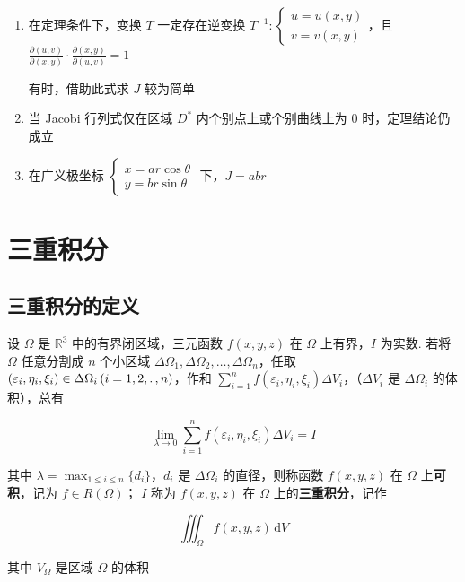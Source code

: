 \documentclass[lang = zh , final , oneside , openany , titlepage , zihao = -4 , linespread = 1.3 , baselineskip = false , cjk-font = windows , text-font = newtx , math-font = newtx , math-style = ISO , uppercase-greek = upright , integral-limits = false]{sjtureport}
\begin{document}
\begin{enumerate}
\item
  在定理条件下，变换 \(T\) 一定存在逆变换
  \(T^{-1}:\begin{cases}u=u(x,y)\\v=v(x,y)\end{cases}\)，且
  \(\frac{\partial (u,v)}{\partial (x,y)}\cdot \frac{\partial (x,y)}{\partial (u,v)} = 1\)

  有时，借助此式求 \(J\) 较为简单
\item
  当 Jacobi 行列式仅在区域 \(D^*\) 内个别点上或个别曲线上为 \(0\)
  时，定理结论仍成立
\item
  在广义极坐标
  \(\begin{cases}x=ar\cos\theta\\y=br\sin\theta\end{cases}\)
  下，\(J = abr\)
\end{enumerate}

\section{三重积分}

\subsection{三重积分的定义}

\begin{definition}
    设 \(\Omega\) 是 \(\mathbb{R}^3\) 中的有界闭区域，三元函数 \(f(x,y,z)\) 在 \(\Omega\) 上有界，\(I\) 为实数. 若将 \(\Omega\) 任意分割成 \(n\) 个小区域 \(\Delta \Omega_1,\Delta\Omega_2,\ldots,\Delta\Omega_n\)，任取 \(\left(\varepsilon_i,\eta_i,\xi_i \right)\in\Delta\Omega_i\left(i=1,2,\ldotp,n\right)\)，作和 \(\displaystyle\sum_{i=1}^nf\left(\varepsilon_i,\eta_i,\xi_i \right)\Delta V_i\)，（\(\Delta V_i\) 是 \(\Delta\Omega_i\) 的体积），总有

    \[\lim_{\lambda\to 0}\sum_{i=1}^nf\left(\varepsilon_i,\eta_i,\xi_i \right)\Delta V_i = I\]

    其中 \(\lambda = \max_{1\leq i\leq n}\{d_i\}\)，\(d_i\) 是 \(\Delta\Omega_i\) 的直径，则称函数 \(f(x,y,z)\) 在 \(\Omega\) 上\textbf{可积}，记为 \(f\in R(\Omega)\)； \(I\) 称为 \(f(x,y,z)\) 在 \(\Omega\) 上的\textbf{三重积分}，记作

    \[\iiint_\Omega f(x,y,z)\,\mathrm{d}V\]

    其中 \(V_\Omega\) 是区域 \(\Omega\) 的体积
\end{definition}
\end{document}
